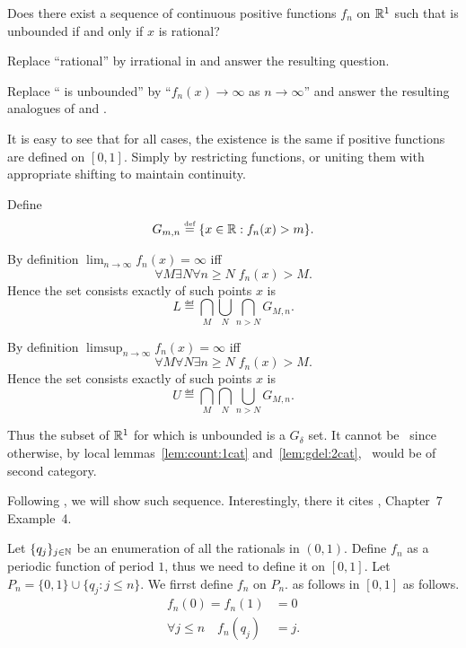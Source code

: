 \nobreak
\begin{enumerate}

\setcounter{enumi}{19}

\begin{excopy}
\begin{itemize}

Does there exist a sequence of continuous positive functions \(f_n\)
on \(\mathbb{R}^1\) such that  is unbounded if and only if $x$ is
rational?

Replace ``rational'' by irrational in  and answer the resulting
question.

Replace `` is unbounded''
by ``\(f_n(x)\to \infty\) as \(n\to\infty\)''
and answer the resulting analogues of  and .
\end{itemize}
\end{excopy}

It is easy to see that for all cases, the existence 
is the same if positive functions are defined on \([0,1]\).
Simply by restricting functions, or uniting them with 
appropriate shifting to maintain continuity.

\begin{itemize}


Define 
\[G_{m,n} \stackrel{\mbox{\upshape\tiny def}}{=} \{x\in\mathbb{R}: f_n(x)>m\}.\]

By definition \(\lim_{n\to\infty} f_n(x) = \infty\) iff
\[\forall M\exists N \forall n\geq N\;f_n(x)>M.\] 
Hence the set consists exactly of such points $x$ is
\[L \eqdef \bigcap_M \bigcup_N \bigcap_{n>N} G_{M,n}.\]

By definition \(\limsup_{n\to\infty} f_n(x) = \infty\) iff
\[\forall M\forall N \exists n\geq N\;f_n(x)>M.\]
Hence the set consists exactly of such points $x$ is
\[U \eqdef \bigcap_M \bigcap_N \bigcup_{n>N} G_{M,n}.\]

Thus the subset of \(\mathbb{R}^1\) for which   is unbounded
is a \(G_\delta\) set. It cannot be \Q\ since otherwise,
by local lemmas~\ref{lem:count:1cat} and~\ref{lem:gdel:2cat},
\Q\ would be of second category.


Following \cite{Myerson:1991:FCF}, we will show such sequence.
Interestingly, there it cites \cite{Gelb1996}, Chapter~7 Example~4.

Let \(\{q_j\}_{j\in\mathbb{N}}\) be an enumeration
of all the rationals in \((0,1)\).
Define \(f_n\) as a periodic function of period $1$,
thus we need to define it on \([0,1]\).
Let \(P_n = \{0,1\} \cup \{q_j: j\leq n\}\). 
We firrst define \(f_n\) on \(P_n\).
as follows in \([0,1]\) as follows.
\begin{align*}
f_n(0) = f_n(1) &= 0 \\
\forall j\leq n\quad f_n(q_j) &= j.
\end{align*}


\end{itemize}
\end{enumerate}
